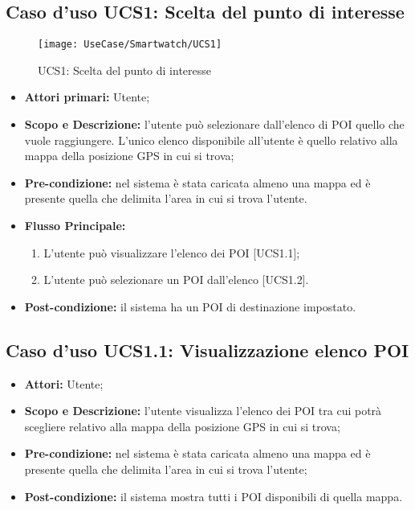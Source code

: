 \subsection{Caso d'uso UCS1: Scelta del punto di interesse}

\begin{figure}[H]
\centering
\texttt{[image: UseCase/Smartwatch/UCS1]}
\caption{UCS1: Scelta del punto di interesse}
\end{figure}

\begin{itemize}
\item \textbf{Attori primari:} Utente;
\item \textbf{Scopo e Descrizione:} l'utente può selezionare dall'elenco di POI quello che vuole raggiungere. L'unico elenco disponibile all'utente è quello relativo alla mappa della posizione GPS in cui si trova; 
\item \textbf{Pre-condizione:} nel sistema è stata caricata almeno una mappa ed è presente quella che delimita l'area in cui si trova l'utente.
\item \textbf{Flusso Principale:}
\begin{enumerate}
\item L'utente può visualizzare l'elenco dei POI [UCS1.1];
\item L'utente può selezionare un POI dall'elenco [UCS1.2].
\end{enumerate}
\item \textbf{Post-condizione:} il sistema ha un POI di destinazione impostato.
\end{itemize}


\subsection{Caso d'uso UCS1.1: Visualizzazione elenco POI}
\begin{itemize}
\item \textbf{Attori:} Utente;
\item \textbf{Scopo e Descrizione:} l’utente visualizza l’elenco dei POI tra cui potrà scegliere relativo alla mappa della posizione GPS in cui si trova;
\item \textbf{Pre-condizione:} nel sistema è stata caricata almeno una mappa ed è presente quella che delimita l'area in cui si trova l'utente;
\item \textbf{Post-condizione:} il sistema mostra tutti i POI disponibili di quella mappa. 
\end{itemize}

